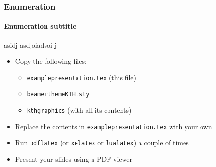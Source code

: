 \documentclass[aspectratio=169]{beamer}
\begin{document}
\begin{frame}
  \frametitle{Enumeration}
  \framesubtitle{Enumeration subtitle}
  asidj asdjoiadsoi j
  \begin{itemize}
    \item Copy the following files:
    \begin{itemize}
    \item \texttt{examplepresentation.tex} (this file)
    \item \texttt{beamerthemeKTH.sty}
    \item \texttt{kthgraphics} (with all its contents)
    \end{itemize}
    \item Replace the contents in \texttt{examplepresentation.tex} with your own
    \item Run \texttt{pdflatex} (or \texttt{xelatex} or \texttt{lualatex}) a couple of times
    \item Present your slides using a PDF-viewer
  \end{itemize}

\end{frame}
\end{document}
